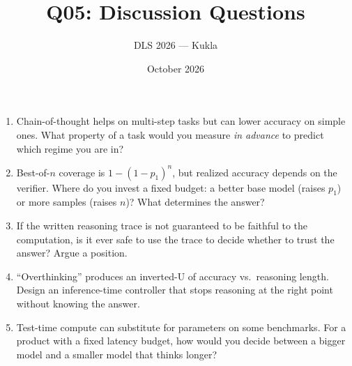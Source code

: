 \documentclass[11pt]{article}
\title{Q05: Discussion Questions}
\author{DLS 2026 --- Kukla}
\date{October 2026}
\begin{document}
\maketitle
\begin{enumerate}[leftmargin=1.5em]
\item Chain-of-thought helps on multi-step tasks but can lower accuracy on simple ones. What property of a task would you measure \emph{in advance} to predict which regime you are in?
\item Best-of-$n$ coverage is $1-(1-p_1)^n$, but realized accuracy depends on the verifier. Where do you invest a fixed budget: a better base model (raises $p_1$) or more samples (raises $n$)? What determines the answer?
\item If the written reasoning trace is not guaranteed to be faithful to the computation, is it ever safe to use the trace to decide whether to trust the answer? Argue a position.
\item ``Overthinking'' produces an inverted-U of accuracy vs.\ reasoning length. Design an inference-time controller that stops reasoning at the right point without knowing the answer.
\item Test-time compute can substitute for parameters on some benchmarks. For a product with a fixed latency budget, how would you decide between a bigger model and a smaller model that thinks longer?
\end{enumerate}
\end{document}
